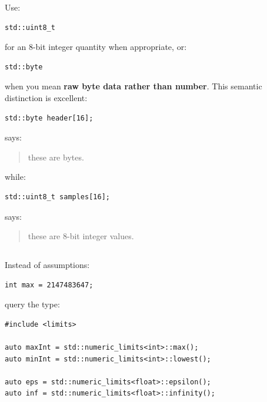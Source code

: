 Use:

\begin{verbatim}
std::uint8_t
\end{verbatim}

for an 8-bit integer quantity when appropriate, or:

\begin{verbatim}
std::byte
\end{verbatim}

when you mean \textbf{raw byte data rather than number}. This semantic distinction is excellent:

\begin{verbatim}
std::byte header[16];
\end{verbatim}

says:

\begin{quote}
these are bytes.
\end{quote}

while:

\begin{verbatim}
std::uint8_t samples[16];
\end{verbatim}

says:

\begin{quote}
these are 8-bit integer values.
\end{quote}

\subsection{\texorpdfstring{}{}}\label{01-foundations-i-ch002-numeric_limits}

\hypertarget{01-foundations-i-ch002-numeric_limits}{}

Instead of assumptions:

\begin{verbatim}
int max = 2147483647;
\end{verbatim}

query the type:

\begin{verbatim}
#include <limits>

auto maxInt = std::numeric_limits<int>::max();
auto minInt = std::numeric_limits<int>::lowest();

auto eps = std::numeric_limits<float>::epsilon();
auto inf = std::numeric_limits<float>::infinity();
\end{verbatim}

